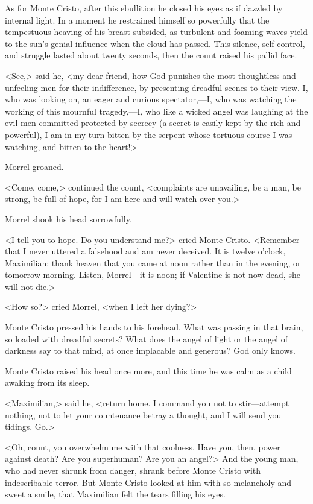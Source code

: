  As for Monte Cristo, after this ebullition he closed his eyes as if dazzled by internal light. In a moment he restrained himself so powerfully that the tempestuous heaving of his breast subsided, as turbulent and foaming waves yield to the sun's genial influence when the cloud has passed. This silence, self-control, and struggle lasted about twenty seconds, then the count raised his pallid face. 

 <See,> said he, <my dear friend, how God punishes the most thoughtless and unfeeling men for their indifference, by presenting dreadful scenes to their view. I, who was looking on, an eager and curious spectator,—I, who was watching the working of this mournful tragedy,—I, who like a wicked angel was laughing at the evil men committed protected by secrecy (a secret is easily kept by the rich and powerful), I am in my turn bitten by the serpent whose tortuous course I was watching, and bitten to the heart!> 

 Morrel groaned. 

 <Come, come,> continued the count, <complaints are unavailing, be a man, be strong, be full of hope, for I am here and will watch over you.> 

 Morrel shook his head sorrowfully. 

 <I tell you to hope. Do you understand me?> cried Monte Cristo. <Remember that I never uttered a falsehood and am never deceived. It is twelve o'clock, Maximilian; thank heaven that you came at noon rather than in the evening, or tomorrow morning. Listen, Morrel—it is noon; if Valentine is not now dead, she will not die.> 

 <How so?> cried Morrel, <when I left her dying?> 

 Monte Cristo pressed his hands to his forehead. What was passing in that brain, so loaded with dreadful secrets? What does the angel of light or the angel of darkness say to that mind, at once implacable and generous? God only knows. 

 Monte Cristo raised his head once more, and this time he was calm as a child awaking from its sleep. 

 <Maximilian,> said he, <return home. I command you not to stir—attempt nothing, not to let your countenance betray a thought, and I will send you tidings. Go.> 

 <Oh, count, you overwhelm me with that coolness. Have you, then, power against death? Are you superhuman? Are you an angel?> And the young man, who had never shrunk from danger, shrank before Monte Cristo with indescribable terror. But Monte Cristo looked at him with so melancholy and sweet a smile, that Maximilian felt the tears filling his eyes. 

